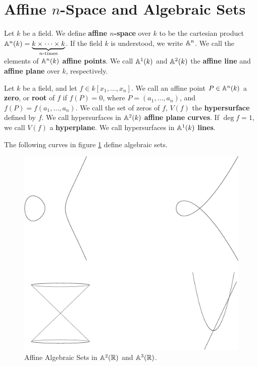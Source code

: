 \section{Affine $n$-Space and Algebraic Sets}\label{section_1.2}

\begin{definition}
  Let $k$ be a field. We define  \textbf{affine $n$-space} over $k$ to be the
  cartesian product  $\mathbb{A}^n(k) = \underbrace{k \times \dots \times
  k}_{n\text{-times}}$. If the field $k$ is understood, we write  $\mathbb{A}^n$. We
  call the elements of  $\mathbb{A}^n(k)$ \textbf{affine points}. We call $\mathbb{A}^1(k)$ and
  $\mathbb{A}^2(k)$ the \textbf{affine line} and \textbf{affine plane} over $k$,
  respectively.
\end{definition}

\begin{definition}
  Let $k$ be a field, and let  $f \in k[x_1, \dots, x_n]$. We call an affine
  point $P \in \mathbb{A}^n(k)$ a \textbf{zero}, or \textbf{root} of $f$ if $f(P)=0$,
  where $P=(a_1, \dots, a_n)$, and $f(P)=f(a_1, \dots, a_n)$. We call
  the set of zeros of $f$, $V(f)$ the \textbf{hypersurface} defined by
  $f$. We call hypersurfaces in  $\mathbb{A}^2(k)$ \textbf{affine plane curves}.
  If $\deg{f}=1$, we call $V(f)$ a \textbf{hyperplane}. We call
  hypersurfaces in $\mathbb{A}^1(k)$ \textbf{lines}.
\end{definition}

\begin{example}\label{example_1.4}
  The following curves in figure \ref{figure_1.1} define algebraic sets.
  \begin{figure}[h]
    \centering
    \includegraphics[scale=0.5]{Figures/chapter1/hyperplanes.eps}
    \caption{Affine Algebraic Sets in $\mathbb{A}^2(\mathbb{R})$ and $\mathbb{A}^3(\mathbb{R})$.}
    \label{figure_1.1}
  \end{figure}
\end{example}

